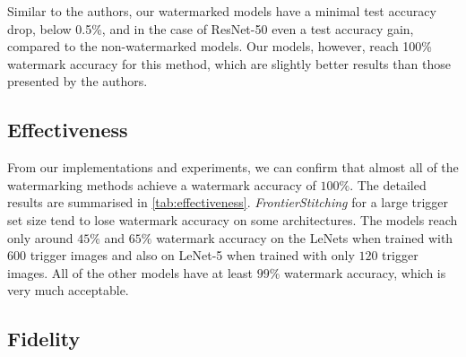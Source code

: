 


Similar to the authors, our watermarked models have a minimal test accuracy drop, below 0.5\%, and in the case of ResNet-50 even a test accuracy gain, compared to the non-watermarked models. Our models, however, reach 100\% watermark accuracy for this method, which are slightly better results than those presented by the authors.


\clearpage

\subsection{Effectiveness} \label{sec:eval-effectiveness}



From our implementations and experiments, we can confirm that almost all of the watermarking methods achieve a watermark accuracy of $100\%$. The detailed results are summarised in \cref{tab:effectiveness}. \textit{FrontierStitching} for a large trigger set size tend to lose watermark accuracy on some architectures. The models reach only around $45\%$ and $65\%$ watermark accuracy on the LeNets when trained with $600$ trigger images and also on LeNet-5 when trained with only $120$ trigger images. All of the other models have at least $99\%$ watermark accuracy, which is very much acceptable.

\clearpage

\subsection{Fidelity} \label{sec:eval-fidelity}

